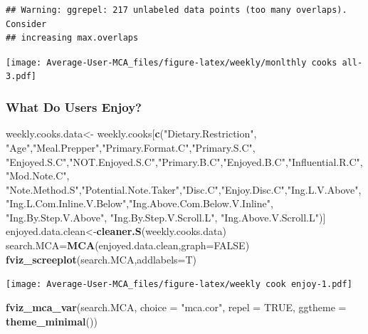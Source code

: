 \documentclass[
]{article}
\newenvironment{Shaded}{\begin{snugshade}}{\end{snugshade}}
\newcommand{\DataTypeTok}[1]{\textcolor[rgb]{0.13,0.29,0.53}{#1}}
\newcommand{\KeywordTok}[1]{\textcolor[rgb]{0.13,0.29,0.53}{\textbf{#1}}}
\newcommand{\NormalTok}[1]{#1}
\newcommand{\OtherTok}[1]{\textcolor[rgb]{0.56,0.35,0.01}{#1}}
\newcommand{\StringTok}[1]{\textcolor[rgb]{0.31,0.60,0.02}{#1}}
\begin{document}
\begin{verbatim}
## Warning: ggrepel: 217 unlabeled data points (too many overlaps). Consider
## increasing max.overlaps
\end{verbatim}

\texttt{[image: Average-User-MCA\_files/figure-latex/weekly/monlthly cooks all-3.pdf]}

\hypertarget{what-do-users-enjoy-2}{%
\subsubsection{What Do Users Enjoy?}\label{what-do-users-enjoy-2}}

\begin{Shaded}
\begin{Highlighting}[]
\NormalTok{weekly.cooks.data<-}\StringTok{ }\NormalTok{weekly.cooks[}\KeywordTok{c}\NormalTok{(}\StringTok{"Dietary.Restriction"}\NormalTok{, }\StringTok{"Age"}\NormalTok{,}\StringTok{"Meal.Prepper"}\NormalTok{,}\StringTok{"Primary.Format.C"}\NormalTok{,}\StringTok{"Primary.S.C"}\NormalTok{,}
            \StringTok{"Enjoyed.S.C"}\NormalTok{,}\StringTok{"NOT.Enjoyed.S.C"}\NormalTok{,}\StringTok{"Primary.B.C"}\NormalTok{,}\StringTok{"Enjoyed.B.C"}\NormalTok{,}\StringTok{"Influential.R.C"}\NormalTok{, }
            \StringTok{"Mod.Note.C"}\NormalTok{, }
            \StringTok{"Note.Method.S"}\NormalTok{,}\StringTok{"Potential.Note.Taker"}\NormalTok{,}\StringTok{"Disc.C"}\NormalTok{,}\StringTok{"Enjoy.Disc.C"}\NormalTok{,}\StringTok{"Ing.L.V.Above"}\NormalTok{,}
            \StringTok{"Ing.L.Com.Inline.V.Below"}\NormalTok{,}\StringTok{"Ing.Above.Com.Below.V.Inline"}\NormalTok{,  }\StringTok{"Ing.By.Step.V.Above"}\NormalTok{,  }\StringTok{"Ing.By.Step.V.Scroll.L"}\NormalTok{,}
            \StringTok{"Ing.Above.V.Scroll.L"}\NormalTok{)]}
\NormalTok{enjoyed.data.clean<-}\KeywordTok{cleaner.S}\NormalTok{(weekly.cooks.data)}
\NormalTok{search.MCA=}\KeywordTok{MCA}\NormalTok{(enjoyed.data.clean,}\DataTypeTok{graph=}\OtherTok{FALSE}\NormalTok{)}
\KeywordTok{fviz_screeplot}\NormalTok{(search.MCA,}\DataTypeTok{addlabels=}\NormalTok{T)}
\end{Highlighting}
\end{Shaded}

\texttt{[image: Average-User-MCA\_files/figure-latex/weekly cook enjoy-1.pdf]}

\begin{Shaded}
\begin{Highlighting}[]
\KeywordTok{fviz_mca_var}\NormalTok{(search.MCA, }\DataTypeTok{choice =} \StringTok{"mca.cor"}\NormalTok{, }\DataTypeTok{repel =} \OtherTok{TRUE}\NormalTok{,}
             \DataTypeTok{ggtheme =} \KeywordTok{theme_minimal}\NormalTok{())}
\end{Highlighting}
\end{Shaded}
\end{document}
